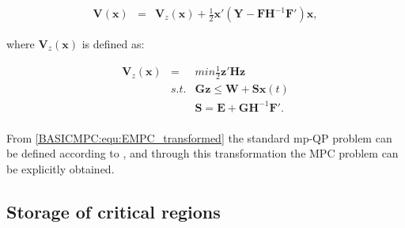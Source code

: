 		\begin{equation}
        \begin{array}{rcl}
				\textbf{V}(\textbf{x})&=&\textbf{V}_z(\textbf{x})+\frac{1}{2}\textbf{x}'\left(\textbf{Y}-\textbf{FH}^{-1}\textbf{F}'\right)\textbf{x},
        \end{array}
        \label{BASICMPC:equ:EMPC_trans_var}
    \end{equation}
		
		where $\textbf{V}_z(\textbf{x})$ is defined as:
		
		\begin{equation}
        \begin{array}{rcl}
				\textbf{V}_z(\textbf{x})&=&min\frac{1}{2}\textbf{z}'\textbf{Hz}\\
				&s.t.&\textbf{Gz}\leq \textbf{W}+\textbf{Sx}(t)\\
				&&\textbf{S}=\textbf{E}+\textbf{GH}^{-1}\textbf{F}'.\\
        \end{array}
        \label{BASICMPC:equ:EMPC_transformed}
    \end{equation}
		
		From \ref{BASICMPC:equ:EMPC_transformed} the standard mp-QP problem can be defined according to \cite{borrelli2017predictive}, and through this transformation the MPC problem can be explicitly obtained. 
		

\subsection{Storage of critical regions}\label{BASICCSR:sec:EMPCStorage}


